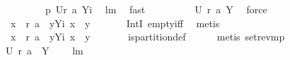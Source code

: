 \begin{isabellebody}
\ \ \ \ \isamarkupfalse%
\ \isamarkupfalse%
\ \isamarkupfalse%
\ {\isachardoublequoteopen}{\isacharquery}p\ {\isacharparenleft}{\isacharquery}U{\isacharbackquote}{\isacharbraceleft}{\isacharparenleft}{\isacharquery}r\ {\isacharquery}a{}{\isacharparenright}{\isacharcomma}\ {\isacharquery}Yi{\isacharbraceright}{\isacharparenright}{\isachardoublequoteclose}\ \isamarkupfalse%
\ lm{}{}\ \isamarkupfalse%
\ fast\isanewline
\ \ \ \ \isamarkupfalse%
\ \isamarkupfalse%
\ {\isachardoublequoteopen}{\isachardot}{\isachardot}{\isachardot}\ {\isacharequal}\ {\isacharbraceleft}{\isacharquery}U\ {\isacharparenleft}{\isacharquery}r\ {\isacharquery}a{}{\isacharparenright}{\isacharcomma}\ {\isacharquery}Y{\isacharbraceright}{\isachardoublequoteclose}\ \isamarkupfalse%
\ force\isanewline
\ \ \ \ \isamarkupfalse%
\ \isamarkupfalse%
\ \isamarkupfalse%
\ {\isachardoublequoteopen}{\isasymforall}\ x\ {\isasymin}\ {\isacharquery}r\ {\isacharquery}a{}{\isachardot}\ {\isasymforall}\ y{\isasymin}{\isacharquery}Yi{\isachardot}\ x\ {\isasymnoteq}\ y{\isachardoublequoteclose}\ \isanewline
\ \ \ \ \isamarkupfalse%
\ IntI\ empty{\isacharunderscore}iff\ \isamarkupfalse%
\ metis\isanewline
\ \ \ \ \isamarkupfalse%
\ \isamarkupfalse%
\ \isamarkupfalse%
\ {\isachardoublequoteopen}{\isasymforall}\ x\ {\isasymin}\ {\isacharquery}r\ {\isacharquery}a{}{\isachardot}\ {\isasymforall}\ y{\isasymin}{\isacharquery}Yi{\isachardot}\ x\ {\isasyminter}\ y\ {\isacharequal}\ {\isacharbraceleft}{\isacharbraceright}{\isachardoublequoteclose}\ \isamarkupfalse%
\ {}\ {}\ {}\ is{\isacharunderscore}partition{\isacharunderscore}def\isanewline
\ \ \ \ \isamarkupfalse%
\ {\isacharparenleft}metis\ set{\isacharunderscore}rev{\isacharunderscore}mp{\isacharparenright}\isanewline
\ \ \ \ \isamarkupfalse%
\ \isamarkupfalse%
\ {\isachardoublequoteopen}{\isacharquery}U\ {\isacharparenleft}{\isacharquery}r\ {\isacharquery}a{}{\isacharparenright}\ {\isasyminter}\ {\isacharquery}Y\ {\isacharequal}\ {\isacharbraceleft}{\isacharbraceright}{\isachardoublequoteclose}\ \isamarkupfalse%
\ lm{}{}\ \isanewline

\end{isabellebody}
